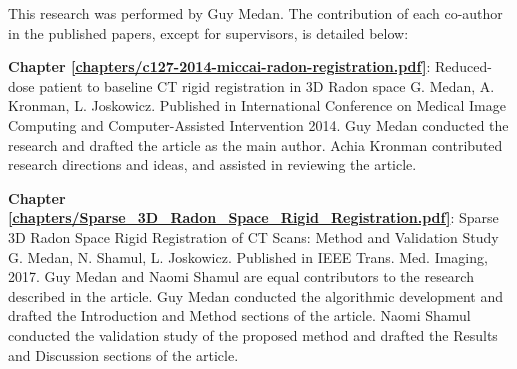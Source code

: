 \cleardoublepage

\thispagestyle{empty}
\begin{contributions}

This research was performed by Guy Medan. The contribution of each co-author in the published papers, except for supervisors, is detailed below:

\textbf{Chapter \ref{chapters/c127-2014-miccai-radon-registration.pdf}}: Reduced-dose patient to baseline CT rigid registration in 3D Radon space
\newline
G. Medan, A. Kronman, L. Joskowicz. Published in International Conference on Medical Image Computing and Computer-Assisted Intervention 2014.
\newline
Guy Medan conducted the research and drafted the article as the main author. Achia Kronman contributed research directions and ideas, and assisted in reviewing the article.

\textbf{Chapter \ref{chapters/Sparse_3D_Radon_Space_Rigid_Registration.pdf}}: Sparse 3D Radon Space Rigid Registration of CT Scans: Method and Validation Study
\newline
G. Medan, N. Shamul, L. Joskowicz. Published in IEEE Trans. Med. Imaging, 2017.
\newline
Guy Medan and Naomi Shamul are equal contributors to the research described in the article.
Guy Medan conducted the algorithmic development and drafted the Introduction and Method sections of the article. 
Naomi Shamul conducted the validation study of the proposed method and drafted the Results and Discussion sections of the article.

\end{contributions}
